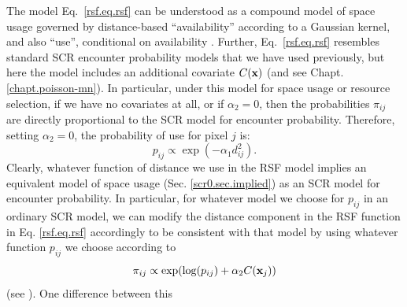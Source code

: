 The model Eq.~\ref{rsf.eq.rsf} can be understood as a compound model
of space usage governed by distance-based ``availability'' according
to a Gaussian kernel, and also ``use'', conditional on availability
\citep{johnson_etal:2008, forester_etal:2009}.  
Further,
Eq.~\ref{rsf.eq.rsf} resembles standard SCR encounter probability
models that we have used previously, but here the model includes an additional
covariate $C({\bf x})$ (and see Chapt. \ref{chapt.poisson-mn}).  In
particular, under this model for space usage or resource selection, if
we have no covariates at all, or if $\alpha_{2} = 0$, then the
probabilities $\pi_{ij}$ are directly proportional to the SCR model
for encounter probability.  Therefore, setting $\alpha_{2} = 0$, 
the probability of use for pixel $j$ is:
\[
p_{ij} \propto  \exp( -\alpha_{1} d_{ij}^{2}).
\]
Clearly, whatever function of distance we use in the RSF model implies
an equivalent model of space usage (Sec. \ref{scr0.sec.implied}) as an
SCR model for encounter probability.  In particular, for whatever
model we choose for $p_{ij}$ in an ordinary SCR model, we can modify
the distance component in the RSF function in Eq. \ref{rsf.eq.rsf}
accordingly to be consistent with that model 
by using whatever function $p_{ij}$ we choose according to
\[
\pi_{ij} \propto \exp( \log(p_{ij}) + \alpha_{2} C({\bf x}_{j}) )
\]
(see \citet{forester_etal:2009}).  One difference between this
